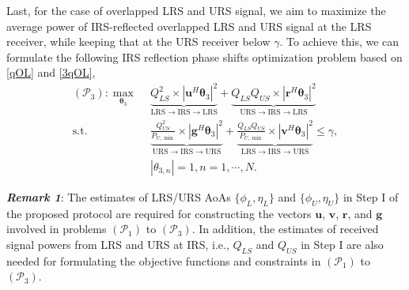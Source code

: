 \documentclass[10pt,final,doublecolumn]{IEEEtran}
\begin{document}
Last, for the case of overlapped LRS and URS signal, we aim to maximize the average power of IRS-reflected overlapped LRS and URS signal at the LRS receiver, while keeping that at the URS receiver below $\gamma$. To achieve this, we can formulate the following IRS reflection phase shifts optimization problem based on \eqref{qOL} and \eqref{3qOL},
\begin{subequations}
\label{33}
\begin{align}
\!\!\!\!(\mathcal{P}_3): \mathop{\max}\limits_{\boldsymbol{\theta}_3}~&~
\underbrace{{{Q_{LS}^2}\times|{\mathbf{u}}^H
\boldsymbol{\theta}_3|^2}}_{\text{LRS}\rightarrow \text{IRS}\rightarrow \text{LRS}}+\underbrace{{{Q_{LS}Q_{US}}\times|{\mathbf{r}}^H
\boldsymbol{\theta}_3|^2}}_{\text{URS}\rightarrow \text{IRS}\rightarrow \text{LRS}}
\label{pj}\\
\text {s.t.}~&~\underbrace{{\frac{Q_{US}^2}{P_{U,\min}}\times|{\mathbf{g}}^H
\boldsymbol{\theta}_3|^2}}_{\text{URS}\rightarrow \text{IRS}\rightarrow \text{URS}}+\underbrace{{\frac{Q_{LS}Q_{US}}{P_{U,\min}}\times|{\mathbf{v}}^H
\boldsymbol{\theta}_3|^2}}_{\text{LRS}\rightarrow \text{IRS}\rightarrow \text{URS}}\leq \gamma,\label{pj1}\\
~&~|{\theta}_{3,n}|= 1, n=1,\cdots,N. \label{pj2}
\end{align}
\end{subequations}

{\bf{\emph{Remark 1}}}: The estimates of LRS/URS AoAs $\{\phi_L, \eta_L\}$ and $\{\phi_U, \eta_U\}$ in Step I of the proposed protocol are required for constructing the vectors $\mathbf{u}$, $\mathbf{v}$, $\mathbf{r}$, and $\mathbf{g}$ involved in problems $(\mathcal{P}_1)$ to $(\mathcal{P}_3)$. In addition, the estimates of received signal powers from LRS and URS at IRS, i.e., $Q_{LS}$ and $Q_{US}$ in Step I are also needed for formulating the objective functions and constraints in $(\mathcal{P}_1)$ to $(\mathcal{P}_3)$.
\end{document}

